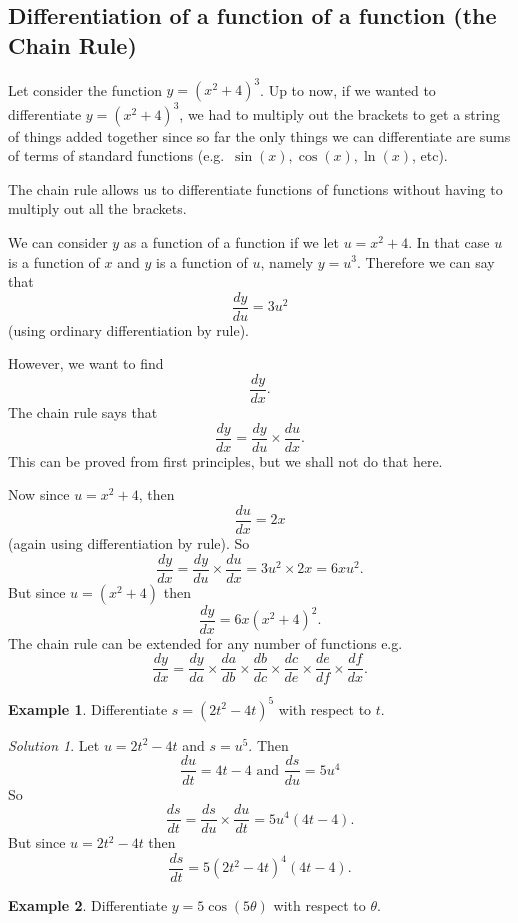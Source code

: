 \documentclass[
  11pt,
  oneside]{book}
\newcommand{\slide}{}
\theoremstyle{definition}
\theoremstyle{definition}
\newtheorem{example}{Example}[chapter]
\theoremstyle{definition}
\theoremstyle{definition}
\theoremstyle{remark}
\newtheorem*{solution}{Solution}
\begin{document}
\subsection{Differentiation of a function of a function (the Chain Rule)}\label{differentiation-of-a-function-of-a-function-the-chain-rule}

Let consider the function \(y = (x^2+ 4)^3\). Up to now, if we wanted to differentiate \(y = (x^2 + 4)^3\), we had to multiply out the brackets to get a string of things added together since so far the only things we can differentiate are sums of terms of standard functions (e.g.~\(\sin(x), \cos(x), \ln(x)\), etc).

The chain rule allows us to differentiate functions of functions without having to multiply out all the brackets.

We can consider \(y\) as a function of a function if we let \(u = x^2 + 4\). In that case \(u\) is a function of \(x\) and \(y\) is a function of \(u\), namely \(y = u^3\). Therefore we can say that
\[
\frac{dy}{du} = 3u^2
\]
(using ordinary differentiation by rule).

However, we want to find
\[
\frac{dy}{dx}.
\]
The chain rule says that
\[
\frac{dy}{dx} = \frac{dy}{du}\times \frac{du}{dx}.
\]
This can be proved from first principles, but we shall not do that here.

Now since \(u = x^2 + 4\), then
\[
\frac{du}{dx} = 2x
\]
(again using differentiation by rule).
So
\[
\frac{dy}{dx} = \frac{dy}{du}\times \frac{du}{dx} = 3u^2\times 2x = 6xu^2.
\]
But since \(u = (x^2+4)\) then
\[
\frac{dy}{dx} = 6x(x^2 +4)^2.
\]
The chain rule can be extended for any number of functions e.g.
\[
\frac{dy}{dx} = \frac{dy}{da}\times \frac{da}{db}\times \frac{db}{dc}\times \frac{dc}{de}\times\frac{de}{df}\times\frac{df}{dx}.
\]
\slide

\begin{example}
Differentiate \(s = (2t^2- 4t)^5\) with respect to \(t\).
\end{example}

\begin{solution}
Let \(u = 2t^2-4t\) and \(s = u^5\). Then
\[
\frac{du}{dt} = 4t-4\text{ and }\frac{ds}{du} = 5u^4
\]
So
\[
\frac{ds}{dt} = \frac{ds}{du}\times\frac{du}{dt} = 5u^4(4t-4).
\]
But since \(u = 2t^2-4t\) then
\[
\frac{ds}{dt} = 5(2t^2-4t)^4(4t-4).
\]
\end{solution}

\slide

\begin{example}
Differentiate \(y=5\cos(5\theta)\) with respect to \(\theta\).
\end{example}
\end{document}

